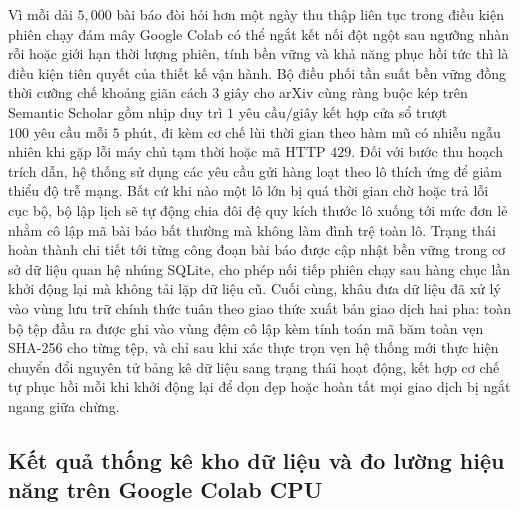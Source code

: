 Vì mỗi dải $5{,}000$ bài báo đòi hỏi hơn một ngày thu thập liên tục trong điều kiện phiên chạy đám mây Google Colab có thể ngắt kết nối đột ngột sau ngưỡng nhàn rỗi hoặc giới hạn thời lượng phiên, tính bền vững và khả năng phục hồi tức thì là điều kiện tiên quyết của thiết kế vận hành. Bộ điều phối tần suất bền vững đồng thời cưỡng chế khoảng giãn cách $3\text{ giây}$ cho arXiv cùng ràng buộc kép trên Semantic Scholar gồm nhịp duy trì $1\text{ yêu cầu/giây}$ kết hợp cửa sổ trượt $100\text{ yêu cầu mỗi } 5\text{ phút}$, đi kèm cơ chế lùi thời gian theo hàm mũ có nhiễu ngẫu nhiên khi gặp lỗi máy chủ tạm thời hoặc mã HTTP $429$. Đối với bước thu hoạch trích dẫn, hệ thống sử dụng các yêu cầu gửi hàng loạt theo lô thích ứng để giảm thiểu độ trễ mạng. Bất cứ khi nào một lô lớn bị quá thời gian chờ hoặc trả lỗi cục bộ, bộ lập lịch sẽ tự động chia đôi đệ quy kích thước lô xuống tới mức đơn lẻ nhằm cô lập mã bài báo bất thường mà không làm đình trệ toàn lô. Trạng thái hoàn thành chi tiết tới từng công đoạn bài báo được cập nhật bền vững trong cơ sở dữ liệu quan hệ nhúng SQLite, cho phép nối tiếp phiên chạy sau hàng chục lần khởi động lại mà không tải lặp dữ liệu cũ. Cuối cùng, khâu đưa dữ liệu đã xử lý vào vùng lưu trữ chính thức tuân theo giao thức xuất bản giao dịch hai pha: toàn bộ tệp đầu ra được ghi vào vùng đệm cô lập kèm tính toán mã băm toàn vẹn SHA-256 cho từng tệp, và chỉ sau khi xác thực trọn vẹn hệ thống mới thực hiện chuyển đổi nguyên tử bảng kê dữ liệu sang trạng thái hoạt động, kết hợp cơ chế tự phục hồi mỗi khi khởi động lại để dọn dẹp hoặc hoàn tất mọi giao dịch bị ngắt ngang giữa chừng.

\subsection{Kết quả thống kê kho dữ liệu và đo lường hiệu năng trên Google Colab CPU}

